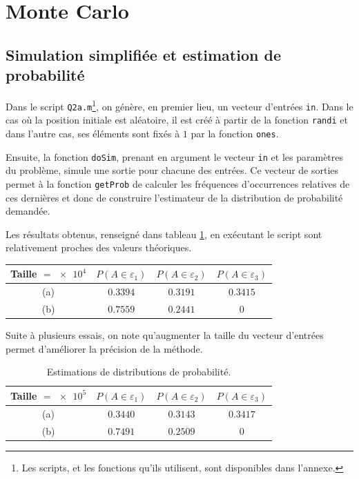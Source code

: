 \documentclass[a4paper, 12pt]{article}
\begin{document}
	\section{Monte Carlo}
	\subsection{Simulation simplifiée et estimation de probabilité}
	Dans le script \texttt{Q2a.m}\footnote{Les scripts, et les fonctions qu'ils utilisent, sont disponibles dans l'annexe.}, on génère, en premier lieu, un vecteur d'entrées \texttt{in}. Dans le cas où la position initiale est aléatoire, il est créé à partir de la fonction \texttt{randi} et dans l'autre cas, ses éléments sont fixés à $1$ par la fonction \texttt{ones}. \par
	Ensuite, la fonction \texttt{doSim}, prenant en argument le vecteur \texttt{in} et les paramètres du problème, simule une sortie pour chacune des entrées. Ce vecteur de sorties permet à la fonction \texttt{getProb} de calculer les fréquences d'occurrences relatives de ces dernières et donc de construire l'estimateur de la distribution de probabilité demandée. \par
	Les résultats obtenus, renseigné dans tableau \ref{table: Q2a1}, en exécutant le script sont relativement proches des valeurs théoriques.
	\begin{table}[H]
		\centering
		\begin{tabular}{|c|c|c|c|}
			\hline
			\textbf{Taille} $= \num{e4}$ & $P(A \in \varepsilon_1)$ & $P(A \in \varepsilon_2)$ & $P(A \in \varepsilon_3)$ \\ \hline\hline
			            (a)              &      $\num{0.3394}$      &      $\num{0.3191}$      &      $\num{0.3415}$      \\ \hline
			            (b)              &      $\num{0.7559}$      &      $\num{0.2441}$      &        $\num{0}$         \\ \hline
		\end{tabular}
		\label{table: Q2a1}
	\end{table}
	Suite à plusieurs essais, on note qu'augmenter la taille du vecteur d'entrées permet d'améliorer la précision de la méthode.
	\begin{table}[H]
		\centering
		\begin{tabular}{|c|c|c|c|}
			\hline
			\textbf{Taille} $= \num{e5}$ & $P(A \in \varepsilon_1)$ & $P(A \in \varepsilon_2)$ & $P(A \in \varepsilon_3)$ \\ \hline\hline
			            (a)              &      $\num{0.3440}$      &      $\num{0.3143}$      &      $\num{0.3417}$      \\ \hline
			            (b)              &      $\num{0.7491}$      &      $\num{0.2509}$      &        $\num{0}$         \\ \hline
		\end{tabular}
		\caption{Estimations de distributions de probabilité.}
		\label{table: Q2a2}
	\end{table}
\end{document}
